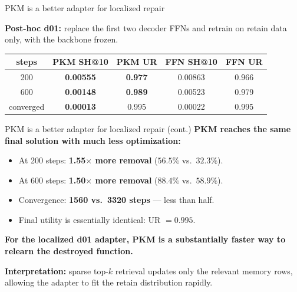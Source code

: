 \documentclass{beamer}
\begin{document}
\begin{frame}{PKM is a better adapter for localized repair}

\textbf{Post-hoc d01:} replace the first two decoder FFNs and retrain on
retain data only, with the backbone frozen.

\medskip

\begin{center}
\begin{tabular}{|c|c|c|c|c|}
\hline
steps & PKM SH@10 & PKM UR & FFN SH@10 & FFN UR \\
\hline
200 &
\textbf{0.00555} & \textbf{0.977} &
0.00863 & 0.966 \\
600 &
\textbf{0.00148} & \textbf{0.989} &
0.00523 & 0.979 \\
\hline
converged &
\textbf{0.00013} & 0.995 &
0.00022 & 0.995 \\
\hline
\end{tabular}
\end{center}


\end{frame}


\begin{frame}{PKM is a better adapter for localized repair (cont.)}
\textbf{PKM reaches the same final solution with much less optimization:}

\begin{itemize}
  \item At 200 steps: \textbf{1.55$\times$ more removal}
        ($56.5\%$ vs.\ $32.3\%$).
  \item At 600 steps: \textbf{1.50$\times$ more removal}
        ($88.4\%$ vs.\ $58.9\%$).
  \item Convergence: \textbf{1560 vs.\ 3320 steps} --- less than half.
  \item Final utility is essentially identical: UR $=0.995$.
\end{itemize}

\medskip

\alert{\textbf{For the localized d01 adapter, PKM is a substantially faster
way to relearn the destroyed function.}}

\medskip

\textbf{Interpretation:} sparse top-$k$ retrieval updates only the relevant
memory rows, allowing the adapter to fit the retain distribution rapidly.

\end{frame}
\end{document}
